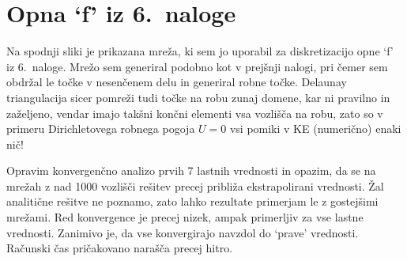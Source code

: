 \section{Opna `f' iz 6.~naloge}

Na spodnji sliki je prikazana mreža, ki sem jo uporabil za diskretizacijo opne `f' iz 6.~naloge. Mrežo sem generiral podobno kot v prejšnji nalogi, pri čemer sem obdržal le točke v nesenčenem delu in generiral robne točke. Delaunay triangulacija sicer pomreži tudi točke na robu zunaj domene, kar ni pravilno in zaželjeno, vendar imajo takšni končni elementi vsa vozlišča na robu, zato so v primeru Dirichletovega robnega pogoja $U=0$ vsi pomiki v KE (numerično) enaki nič!


Opravim konvergenčno analizo prvih 7 lastnih vrednosti in opazim, da se na mrežah z nad 1000 vozlišči rešitev precej približa ekstrapolirani vrednosti. Žal analitične rešitve ne poznamo, zato lahko rezultate primerjam le z gostejšimi mrežami. Red konvergence je precej nizek, ampak primerljiv za vse lastne vrednosti. Zanimivo je, da vse konvergirajo navzdol do `prave' vrednosti. Računski čas pričakovano narašča precej hitro.

